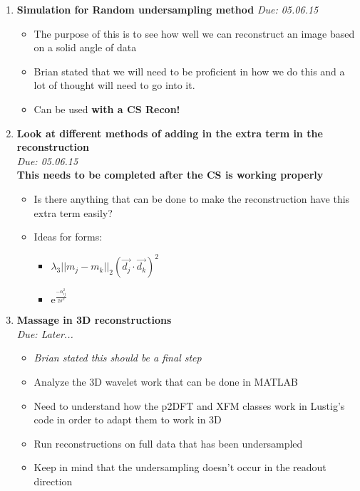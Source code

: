 \documentclass[11 pt]{article}
\newcommand{\me}{\mathrm{e}}
\newcommand{\bo}{\noindent\textbf}
\begin{document}
\begin{enumerate}
      \item \bo{Simulation for Random undersampling method}
	    \emph{Due: 05.06.15}
	    \begin{itemize}
		  \item The purpose of this is to see how well we can reconstruct an image based on a solid angle of data
		  \item Brian stated that we will need to be proficient in how we do this and a lot of thought will need to go into it.
		  \item Can be used \bo{with a CS Recon!}
	    \end{itemize}
      
      
       \item \bo{Look at different methods of adding in the extra term in the reconstruction}\\
	    \emph{Due: 05.06.15}\\
	    \bo{This needs to be completed after the CS is working properly}
	    \begin{itemize}
		  \item Is there anything that can be done to make the reconstruction have this extra term easily?
		  \item Ideas for forms:
		  \begin{itemize}
		      \item $\lambda_3 ||m_j - m_k||_2 (\vec{d_j} \cdot \vec{d_k})^2$
		      \item $\me^{\frac{-\alpha_{ij}^2}{2\sigma^2}}$
		  \end{itemize}
	    \end{itemize}
      
      \item \bo{Massage in 3D reconstructions}\\
	    \emph{Due: Later...}\\
	    \begin{itemize}
		  \item \emph{Brian stated this should be a final step}
		  \item Analyze the 3D wavelet work that can be done in MATLAB
		  \item Need to understand how the p2DFT and XFM classes work in Lustig's code in order to adapt them to work in 3D
		  \item Run reconstructions on full data that has been undersampled
		  \item Keep in mind that the undersampling doesn't occur in the readout direction
	    \end{itemize}

      


\end{enumerate}
\end{document}
